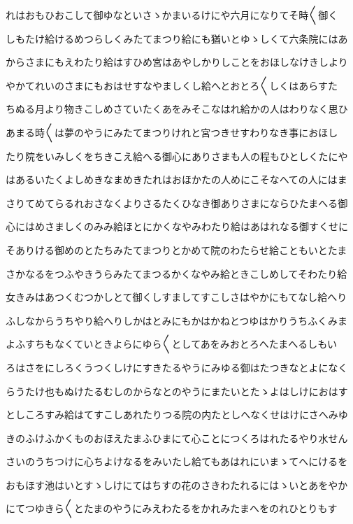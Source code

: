 \documentclass[a4paper,11pt,landscape]{ltjtarticle}
\begin{document}
れはおもひおこして御ゆなといさゝかまいるけにや六月になりてそ時〱御く
\par\medskip
しもたけ給けるめつらしくみたてまつり給にも猶いとゆゝしくて六条院にはあ
\par\medskip
からさまにもえわたり給はすひめ宮はあやしかりしことをおほしなけきしより
\par\medskip
やかてれいのさまにもおはせすなやましくし給へとおとろ〱しくはあらすた
\par\medskip
ちぬる月より物きこしめさていたくあをみそこなはれ給かの人はわりなく思ひ
\par\medskip
あまる時〱は夢のやうにみたてまつりけれと宮つきせすわりなき事におほし
\par\medskip
たり院をいみしくをちきこえ給へる御心にありさまも人の程もひとしくたにや
\par\medskip
はあるいたくよしめきなまめきたれはおほかたの人めにこそなへての人にはま
\par\medskip
さりてめてらるれおさなくよりさるたくひなき御ありさまにならひたまへる御
\par\medskip
心にはめさましくのみみ給ほとにかくなやみわたり給はあはれなる御すくせに
\par\medskip
そありける御めのとたちみたてまつりとかめて院のわたらせ給こともいとたま
\par\medskip
さかなるをつふやきうらみたてまつるかくなやみ給ときこしめしてそわたり給
\par\medskip
女きみはあつくむつかしとて御くしすましてすこしさはやかにもてなし給へり
\par\medskip
ふしなからうちやり給へりしかはとみにもかはかねとつゆはかりうちふくみま
\par\medskip
よふすちもなくていときよらにゆら〱としてあをみおとろへたまへるしもい
\par\medskip
ろはさをにしろくうつくしけにすきたるやうにみゆる御はたつきなとよになく
\par\medskip
らうたけ也もぬけたるむしのからなとのやうにまたいとたゝよはしけにおはす
\par\medskip
としころすみ給はてすこしあれたりつる院の内たとしへなくせはけにさへみゆ
\par\medskip
きのふけふかくものおほえたまふひまにて心ことにつくろはれたるやり水せん
\par\medskip
さいのうちつけに心ちよけなるをみいたし給てもあはれにいまゝてへにけるを
\par\medskip
おもほす池はいとすゝしけにてはちすの花のさきわたれるにはゝいとあをやか
\par\medskip
にてつゆきら〱とたまのやうにみえわたるをかれみたまへをのれひとりもす
\end{document}

